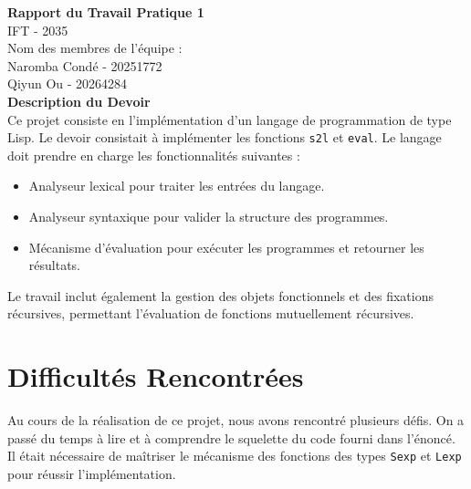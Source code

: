 \documentclass[a4paper,12pt]{article}
\begin{document}
\begin{titlepage}
    \centering
    \vspace*{1cm}
    {\huge \textbf{Rapport du Travail Pratique 1}}\\
    \vspace{0.5cm}
    {\large IFT - 2035}\\
    \vspace{1.5cm}
    {\large Nom des membres de l'équipe :}\\
    \vspace{0.5cm}
    {\large Naromba Condé    -    20251772}\\
    {\large Qiyun Ou         -    20264284}\\

    \vspace{2cm}
    {\Large \textbf{Description du Devoir}}\\
    \vspace{0.5cm}
    {\large Ce projet consiste en l'implémentation d'un langage de programmation de type Lisp. Le devoir consistait à implémenter les fonctions \texttt{s2l} et \texttt{eval}. Le langage doit prendre en charge les fonctionnalités suivantes :}\\
    \begin{itemize}
        \item Analyseur lexical pour traiter les entrées du langage.
        \item Analyseur syntaxique pour valider la structure des programmes.
        \item Mécanisme d'évaluation pour exécuter les programmes et retourner les résultats.
    \end{itemize}
    {\large Le travail inclut également la gestion des objets fonctionnels et des fixations récursives, permettant l'évaluation de fonctions mutuellement récursives.}\\
    \vfill
\end{titlepage}

\section{Difficultés Rencontrées}

Au cours de la réalisation de ce projet, nous avons rencontré plusieurs défis. On a passé du temps à lire et à comprendre le squelette du code fourni dans l'énoncé. Il était nécessaire de maîtriser le mécanisme des fonctions des types \texttt{Sexp} et \texttt{Lexp} pour réussir l'implémentation.
\end{document}
